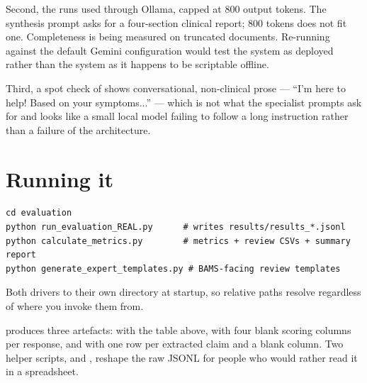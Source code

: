 Second, the runs used  through Ollama, capped at 800 output tokens. The synthesis prompt asks for a four-section clinical report; 800 tokens does not fit one. Completeness is being measured on truncated documents. Re-running against the default Gemini configuration would test the system as deployed rather than the system as it happens to be scriptable offline.

Third, a spot check of  shows conversational, non-clinical prose --- ``I'm here to help! Based on your symptoms...'' --- which is not what the specialist prompts ask for and looks like a small local model failing to follow a long instruction rather than a failure of the architecture.

\section{Running it}

\begin{lstlisting}[style=shell]
cd evaluation
python run_evaluation_REAL.py      # writes results/results_*.jsonl
python calculate_metrics.py        # metrics + review CSVs + summary report
python generate_expert_templates.py # BAMS-facing review templates
\end{lstlisting}

Both drivers  to their own directory at startup, so relative paths resolve regardless of where you invoke them from.

 produces three artefacts:  with the table above,  with four blank scoring columns per response, and  with one row per extracted claim and a blank  column. Two helper scripts,  and , reshape the raw JSONL for people who would rather read it in a spreadsheet.
